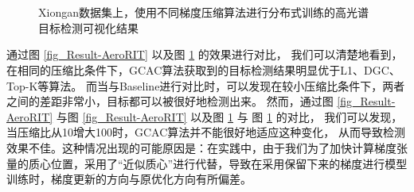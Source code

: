 \documentclass{xdupgthesis}
\begin{document}
\begin{figure}[ht]
{        \label{fig_Result-Xiongan-gcc-cr0.1}
    } \\
     \\
    \caption{Xiongan数据集上，使用不同梯度压缩算法进行分布式训练的高光谱目标检测可视化结果}
    \label{fig_Result-Xiongan}
\end{figure}

通过图 \ref{fig_Result-AeroRIT} 以及图 \ref{fig_Result-Xiongan} 的效果进行对比，
我们可以清楚地看到，在相同的压缩比条件下，GCAC算法获取到的目标检测结果明显优于L1、DGC、Top-K等算法。
而当与Baseline进行对比时，可以发现在较小压缩比条件下，两者之间的差距非常小，目标都可以被很好地检测出来。
然而，通过图 \ref{fig_Result-AeroRIT}  与图 \ref{fig_Result-AeroRIT}  
以及图 \ref{fig_Result-Xiongan}  与
图 \ref{fig_Result-Xiongan}  的对比，
我们可以发现，当压缩比从10增大100时，GCAC算法并不能很好地适应这种变化，
从而导致检测效果不佳。这种情况出现的可能原因是：在实践中，由于我们为了加快计算梯度张量的质心位置，采用了“近似质心”进行代替，导致在采用保留下来的梯度进行模型训练时，梯度更新的方向与原优化方向有所偏差。
\end{document}
